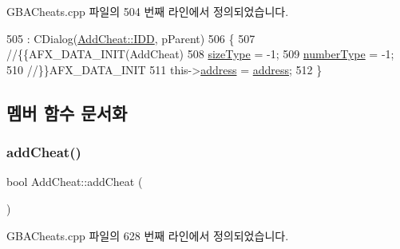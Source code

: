 G\+B\+A\+Cheats.\+cpp 파일의 504 번째 라인에서 정의되었습니다.


\begin{DoxyCode}
505   : CDialog(\mbox{\hyperlink{class_add_cheat_af696833b823db49de5667fcb42b11a26afedef0c6962fabc2ac997728fd544a12}{AddCheat::IDD}}, pParent)
506 \{
507   \textcolor{comment}{//\{\{AFX\_DATA\_INIT(AddCheat)}
508   \mbox{\hyperlink{class_add_cheat_a7c3af367e51b1812d951dd2d24ac1aa8}{sizeType}} = -1;
509   \mbox{\hyperlink{class_add_cheat_a50115e7ad42a106db574754cc81bc9a0}{numberType}} = -1;
510   \textcolor{comment}{//\}\}AFX\_DATA\_INIT}
511   this->\mbox{\hyperlink{class_add_cheat_ae21ae20b0a2e3b936b9ecbacb13a2751}{address}} = \mbox{\hyperlink{class_add_cheat_ae21ae20b0a2e3b936b9ecbacb13a2751}{address}};
512 \}
\end{DoxyCode}


\subsection{멤버 함수 문서화}
\mbox{\label{class_add_cheat_a53989b2f3f179185384d258c9e71ace7}} 
\subsubsection{\texorpdfstring{add\+Cheat()}{addCheat()}}
{\footnotesize\ttfamily bool Add\+Cheat\+::add\+Cheat (\begin{DoxyParamCaption}{ }\end{DoxyParamCaption})}



G\+B\+A\+Cheats.\+cpp 파일의 628 번째 라인에서 정의되었습니다.


